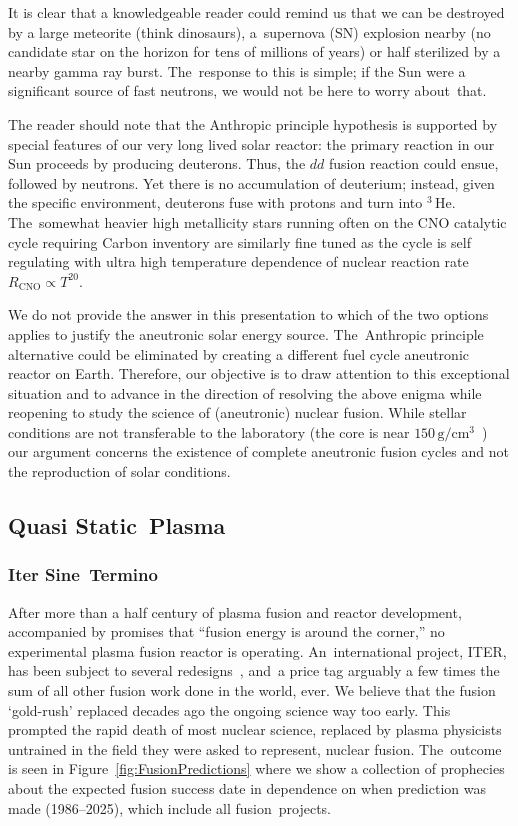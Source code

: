 \documentclass[particles,article,accept,pdftex,moreauthors]{Definitions/mdpi}
\newcommand*{\xblue}{}
\begin{document}
It is clear that a knowledgeable reader could remind us that we can be destroyed by a large meteorite (think dinosaurs), a~supernova (SN) explosion nearby (no candidate star on the horizon for tens of millions of years) or half sterilized by a nearby gamma ray burst. The~response to this is simple; if the Sun were a significant source of fast neutrons, we would not be here to worry about~that.

The reader should note that the Anthropic principle hypothesis is supported by special features of our very long lived solar reactor: the primary reaction in our Sun proceeds by producing deuterons. Thus, the $dd$ fusion reaction could ensue, followed by neutrons. Yet there is no accumulation of deuterium; instead, given the specific environment, deuterons fuse with protons and turn into ${}^3\,\mathrm{He}$. The~somewhat heavier high metallicity stars running often on the CNO catalytic cycle requiring Carbon inventory are similarly fine tuned as the cycle is self regulating with ultra high temperature dependence of nuclear reaction rate $R_\mathrm{CNO}\propto T^{20}$.

We do not provide the answer in this presentation to which of the two options applies to justify the aneutronic solar energy source. The~Anthropic principle alternative could be eliminated by creating a different fuel cycle aneutronic reactor on Earth. Therefore, our objective is to draw attention to this exceptional situation and to advance in the direction of resolving the above enigma while reopening to study the science of (aneutronic) nuclear fusion. {\xblue While stellar conditions are not transferable to the laboratory (the core is near $150\,\mathrm{g/cm^3}$~\cite{Bahcall:2000nu}) our argument concerns the existence of complete aneutronic fusion cycles and not the reproduction of solar conditions.}


\subsection{Quasi Static~Plasma}\label{ssec:plasmaF}
\subsubsection{Iter Sine~Termino}\label{sssec:INTiter}
After more than a half century of plasma fusion and reactor development, accompanied by promises that ``fusion energy is around the corner,'' no experimental plasma fusion reactor is operating. An~international project, ITER, has been subject to several redesigns~\cite{Aymer:2001,ITR-18-003,ITR-24-005,loarte2025new}, and~a price tag arguably a few times the sum of all other fusion work done in the world, ever. We believe that the fusion `gold-rush' replaced decades ago the ongoing science way too early. This prompted the rapid death of most nuclear science, replaced by plasma physicists untrained in the field they were asked to represent, nuclear fusion. The~outcome is seen in Figure~\ref{fig:FusionPredictions} where we show a collection of prophecies about the expected fusion success date in dependence on when prediction was made (1986--2025), which include all fusion~projects.
\end{document}
